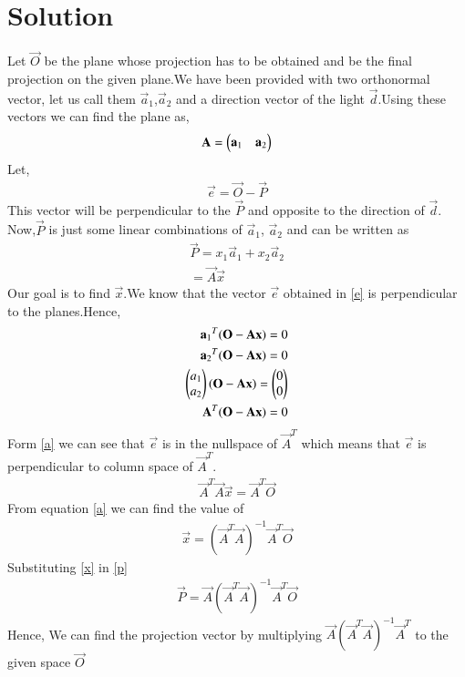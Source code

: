 \documentclass[journal,12pt,twocolumn]{IEEEtran}
\begin{document}
\section{\textbf{Solution}}
Let $\vec{O}$ be the plane whose projection has to be obtained and  be the final projection on the given plane.We have been provided with two orthonormal vector, let us call them $\vec{a}_1$,$\vec{a}_2$ and a direction vector of the light $\vec{d}$.Using these vectors we can find the plane as,
\begin{align}
\mathbf{A}=\begin{pmatrix}\mathbf{a}_1&\mathbf{a}_2\end{pmatrix}
\end{align}
Let,
\begin{align}
\vec{e}=\vec{O}-\vec{P}\label{e}
\end{align}
This vector will be perpendicular to the $\vec{P}$ and opposite to the direction of $\vec{d}$.\\
Now,$\vec{P}$ is just some linear combinations of $\vec{a}_1$, $\vec{a}_2$ and can be written as
\begin{align}
\vec{P}=x_1\vec{a}_1+x_2\vec{a}_2\\
=\vec{A}\vec{x}\label{p}
\end{align}
Our goal is to find $\vec{x}$.We know that the vector $\vec{e}$ obtained in \eqref{e} is perpendicular to the planes.Hence,
\begin{align}
{\mathbf{a}_1}^T(\mathbf{O}-\mathbf{A}\mathbf{x})=0\\
{\mathbf{a}_2}^T(\mathbf{O}-\mathbf{A}\mathbf{x})=0\\
\begin{pmatrix}{a_1}\\{a_2}\end{pmatrix}(\mathbf{O}-\mathbf{A}\mathbf{x})=\begin{pmatrix}0\\0\end{pmatrix}\\
\mathbf{A}^T(\mathbf{O}-\mathbf{A}\mathbf{x})=0\label{a}
\end{align}
Form \eqref{a} we can see that $\vec{e}$ is in the nullspace of $\vec{A}^T$ which means that $\vec{e}$ is perpendicular to column space of $\vec{A}^T$.
\begin{align}
\vec{A}^T\vec{A}\vec{x}=\vec{A}^T\vec{O}
\end{align}
From equation \eqref{a} we can find the value of 
\begin{align}
\vec{x}=(\vec{A}^T\vec{A})^{-1}\vec{A}^T\vec{O}\label{x}
\end{align}
Substituting \eqref{x} in \eqref{p}
\begin{align}
\vec{P}=\vec{A}(\vec{A}^T\vec{A})^{-1}\vec{A}^T\vec{O}
\end{align}
Hence, We can find the projection vector by multiplying $\vec{A}(\vec{A}^T\vec{A})^{-1}\vec{A}^T$ to the given space $\vec{O}$
 
\end{document}
